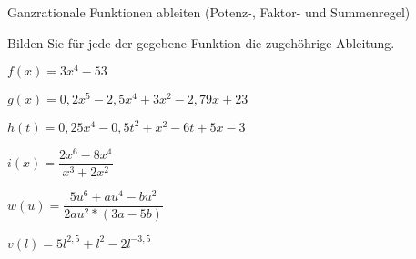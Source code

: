 \documentclass[
    ngerman,
    color=1b,
    load_common,
    leqno,
    boxarc,
    solution=true,
]{rubos-tuda-template}
\begin{document}
\begin{task}[points=9]{Ganzrationale Funktionen ableiten (Potenz-, Faktor- und Summenregel)}
    \begin{grayInfoBox}
        Bilden Sie für jede der gegebene Funktion die zugehöhrige Ableitung.
    \end{grayInfoBox}
    \begin{cpenumerate}[label=\alph*), itemsep=1em]
        \item $f(x)=3x^4-53$ 
        \item $g(x)=0,2x^5-2,5x^4+3x^2-2,79x+23$ 
        \item $h(t)=0,25x^4-0,5t^2+x^2-6t+5x-3$ 
        \item $i(x)=\dfrac{2x^6-8x^4}{x^3+2x^2}$ 
        \item $w(u)=\dfrac{5u^6+au^4-bu^2}{2au^2*(3a-5b)}$ 
        \item $v(l)=5l^{2,5}+l^2-2l^{-3,5}$ 
    \end{cpenumerate}
\end{task}
\clearpage
\end{document}
